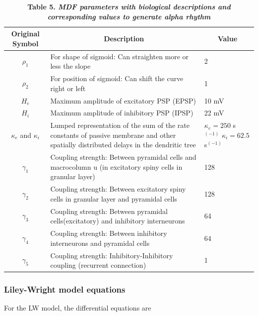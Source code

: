 \documentclass[12pt,twoside]{article}
\begin{document}
\begin{table}[H]
\begin{tabular}{|c|p{10cm}|p{2.5cm}| }
\hline
Original Symbol & \multicolumn{1}{|c|}{Description} & \multicolumn{1}{c|}{Value}  \\ 
 \hline
$\rho_{1}$ & For shape of sigmoid: Can straighten more or less the slope & 2 \\ 
 \hline
$\rho_{2}$ & For position of sigmoid: Can shift the curve right or left & 1 \\ 
 \hline
$H_{e}$ & Maximum amplitude of excitatory PSP (EPSP) & 10 mV \\%
 \hline
$H_{i}$ & Maximum amplitude of inhibitory PSP (IPSP) & 22 mV \\%
 \hline
$\kappa_{e}$ and $\kappa_{i}$ & Lumped representation of the sum of the rate constants of passive membrane and other spatially distributed delays in the dendritic tree & $\kappa_{e}= 250$ s$^{(-1)}$ \newline $\kappa_{i}= 62.5$ s$^{(-1)}$\\
 \hline
$\gamma_{1}$ & Coupling strength: Between pyramidal cells and macrocolumn u (in excitatory spiny cells in granular layer) & 128\\
\hline
$\gamma_{2}$ & Coupling strength: Between excitatory spiny cells in granular layer and pyramidal cells & 128\\
\hline
$\gamma_{3}$ & Coupling strength: Between pyramidal cells(excitatory) and inhibitory interneurons & 64\\
\hline
$\gamma_{4}$ & Coupling strength: Between inhibitory interneurons and pyramidal cells & 64\\
\hline
$\gamma_{5}$ & Coupling strength: Inhibitory-Inhibitory coupling (recurrent connection) & 1 \\%
\hline
\end{tabular}
\caption*{\textbf{Table 5.  \textit{MDF parameters with biological descriptions and corresponding values to generate alpha rhythm}}}
\label{tab:Moran}
\end{table}



\subsubsection*{Liley-Wright model equations}

For the LW model, the differential equations are
\end{document}

